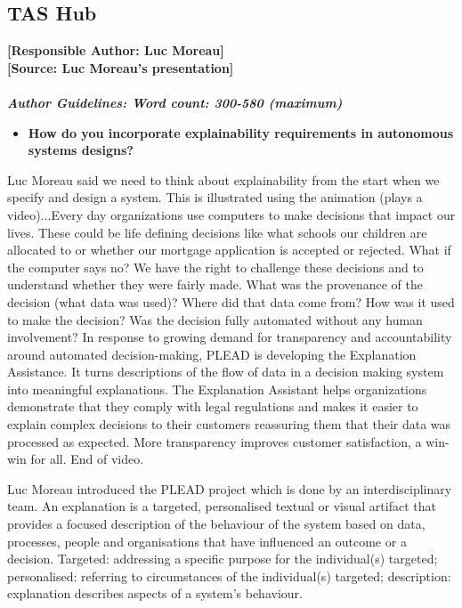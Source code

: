 \documentclass[sigconf]{acmart}
\begin{document}
\subsection{TAS Hub}
\noindent\textbf{[Responsible Author:  Luc Moreau]}\\
\noindent\textbf{[Source: Luc Moreau's presentation]}\\\\
\noindent\textbf{\textit{Author Guidelines: Word count: 300-580 (maximum)}}\\
\begin{itemize}
	\item \textbf{How do you incorporate explainability requirements in autonomous systems designs?}
\end{itemize}
Luc Moreau said we need to think about explainability from the start when we specify and design a system. This is illustrated using the animation (plays a video)...Every day organizations use computers to make decisions that impact our lives. These could be life defining decisions like what schools our children are allocated to or whether our mortgage application is accepted or rejected. What if the computer says no? We have the right to challenge these decisions and to understand whether they were fairly made. What was the provenance of the decision (what data was used)? Where did that data come from? How was it used to make the decision? Was the decision fully automated without any human involvement? In response to growing demand for transparency and accountability around automated decision-making, PLEAD is developing the Explanation Assistance. It turns descriptions of the flow of data in a decision making system into meaningful explanations. The Explanation Assistant helps organizations demonstrate that they comply with legal regulations and makes it easier to explain complex decisions to their customers reassuring them that their data was processed as expected. More transparency improves customer satisfaction, a win-win for all. End of video.

Luc Moreau introduced the PLEAD project which is done by an interdisciplinary team. 
An explanation is a targeted, personalised textual or visual artifact that provides a focused description of the behaviour of the system based on data, processes, people and organisations that have influenced an outcome or a decision. 
Targeted: addressing a specific purpose for the individual(s) targeted; personalised: referring to circumstances of the individual(s) targeted; description: explanation describes aspects of a system's behaviour. 
\end{document}
